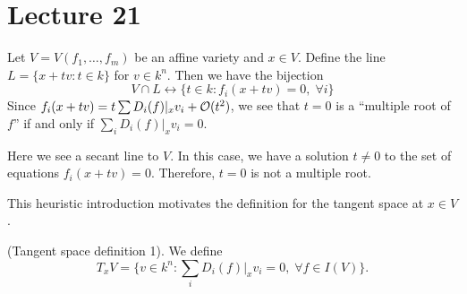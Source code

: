 \section{Lecture 21}
Let $V=V(f_1,\dots, f_m)$ be an affine variety and $x\in V$. Define the line $L=\{x+tv:t\in k\}$ for $v\in k^n$. 
Then we have the bijection 
\begin{equation}
    V\cap L \leftrightarrow \{t\in k:f_i(x+tv)=0,\;\forall i\}
\end{equation}
Since $f_i(x+tv) = t \sum D_i(f)|_x v_i + \mathcal{O}(t^2)$, we see that $t=0$ is a ``multiple root of 
$f$'' if and only if $\sum_i D_i(f)|_x v_i=0$. 
\begin{center}
\par

Here we see a secant line to $V$. In this case, we have a solution $t\neq 0$ to the set of equations 
$f_i(x+tv)=0$. Therefore, $t=0$ is not a multiple root.
\end{center}

This heuristic introduction motivates the definition for the tangent space at $x\in V$. 
\begin{dang}
\begin{definition}
    (Tangent space definition 1).
    We define
    \begin{equation}
        T_x V = \{v\in k^n : \sum_i D_i(f)|_x v_i=0,\;\forall f\in I(V)\}.
    \end{equation}
\end{definition}
\end{dang}

